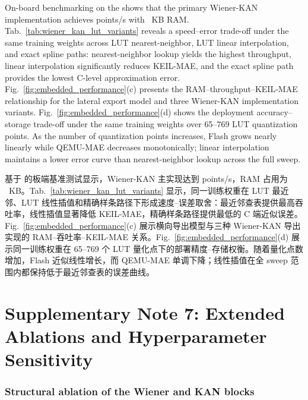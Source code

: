 \documentclass[sn-nature]{sn-jnl}
\newif\ifCNENEnglish
\newif\ifCNENBilingual
\newcommand{\CNEN}[2]{%
    \ifCNENBilingual
        #1%
        \if\relax\detokenize{#2}\relax\else\par #2\fi%
    \else
        \ifCNENEnglish
            #2%
        \else
            #1%
        \fi
    \fi
}
\begin{document}
\CNEN{基于 \valTargetMcu{} 的板端基准测试显示，Wiener-KAN 主实现达到 \valPrimaryKeilFps{} points/s，RAM 占用为 \valPrimaryKeilRamKB~KB。Tab.~\ref{tab:wiener_kan_lut_variants} 显示，同一训练权重在 LUT 最近邻、LUT 线性插值和精确样条路径下形成速度--误差取舍：最近邻查表提供最高吞吐率，线性插值显著降低 KEIL-MAE，精确样条路径提供最低的 C 端近似误差。Fig.~\ref{fig:embedded_performance}(c) 展示横向导出模型与三种 Wiener-KAN 导出实现的 RAM--吞吐率--KEIL-MAE 关系。Fig.~\ref{fig:embedded_performance}(d) 展示同一训练权重在 65--769 个 LUT 量化点下的部署精度--存储权衡。随着量化点数增加，Flash 近似线性增长，而 QEMU-MAE 单调下降；线性插值在全 sweep 范围内都保持低于最近邻查表的误差曲线。}{On-board benchmarking on the \valTargetMcu{} shows that the primary Wiener-KAN implementation achieves \valPrimaryKeilFps{} points/s with \valPrimaryKeilRamKB~KB RAM. Tab.~\ref{tab:wiener_kan_lut_variants} reveals a speed--error trade-off under the same training weights across LUT nearest-neighbor, LUT linear interpolation, and exact spline paths: nearest-neighbor lookup yields the highest throughput, linear interpolation significantly reduces KEIL-MAE, and the exact spline path provides the lowest C-level approximation error. Fig.~\ref{fig:embedded_performance}(c) presents the RAM--throughput--KEIL-MAE relationship for the lateral export model and three Wiener-KAN implementation variants. Fig.~\ref{fig:embedded_performance}(d) shows the deployment accuracy--storage trade-off under the same training weights over 65--769 LUT quantization points. As the number of quantization points increases, Flash grows nearly linearly while QEMU-MAE decreases monotonically; linear interpolation maintains a lower error curve than nearest-neighbor lookup across the full sweep.%
}


\section{Supplementary Note 7: Extended Ablations and Hyperparameter Sensitivity}

\subsubsection{Structural ablation of the Wiener and KAN blocks}
\end{document}
